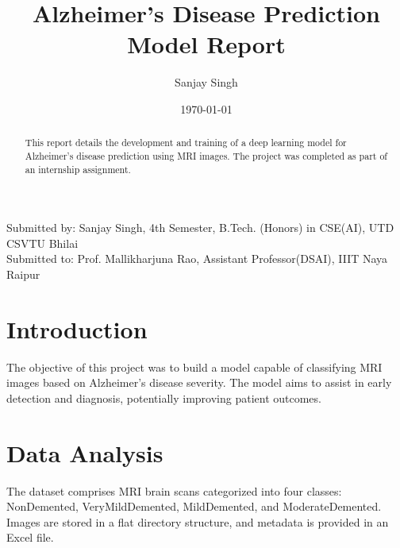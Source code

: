 \documentclass{article}
\title{Alzheimer's Disease Prediction Model Report}
\author{Sanjay Singh}
\date{\today}
\begin{document}
\maketitle

\begin{center}
Submitted by: Sanjay Singh, 4th Semester, B.Tech. (Honors) in CSE(AI), UTD CSVTU Bhilai \\
Submitted to: Prof. Mallikharjuna Rao, Assistant Professor(DSAI), IIIT Naya Raipur
\end{center}

\begin{abstract}
This report details the development and training of a deep learning model for Alzheimer's disease prediction using MRI images. The project was completed as part of an internship assignment.
\end{abstract}

\section{Introduction}
The objective of this project was to build a model capable of classifying MRI images based on Alzheimer's disease severity. The model aims to assist in early detection and diagnosis, potentially improving patient outcomes.

\section{Data Analysis}
The dataset comprises MRI brain scans categorized into four classes: NonDemented, VeryMildDemented, MildDemented, and ModerateDemented. Images are stored in a flat directory structure, and metadata is provided in an Excel file.
\end{document}
